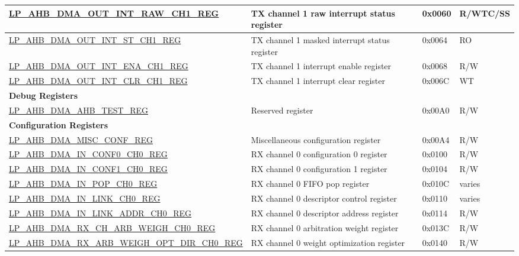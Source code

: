 \begin{longtable}{ | l | p{10cm} | p{1.3cm} | l | }
\hyperref[regdesc:LPAHBDMAOUTINTRAWCHNREG]{LP\_AHB\_DMA\_OUT\_INT\_RAW\_CH1\_REG} & TX channel 1 raw interrupt status register & 0x0060 & R/WTC/SS \\ \hline
\hyperref[regdesc:LPAHBDMAOUTINTSTCHNREG]{LP\_AHB\_DMA\_OUT\_INT\_ST\_CH1\_REG} & TX channel 1 masked interrupt status register & 0x0064 & RO \\ \hline
\hyperref[regdesc:LPAHBDMAOUTINTENACHNREG]{LP\_AHB\_DMA\_OUT\_INT\_ENA\_CH1\_REG} & TX channel 1 interrupt enable register & 0x0068 & R/W \\ \hline
\hyperref[regdesc:LPAHBDMAOUTINTCLRCHNREG]{LP\_AHB\_DMA\_OUT\_INT\_CLR\_CH1\_REG} & TX channel 1 interrupt clear register & 0x006C & WT \\ \hline
\multicolumn{4}{|l|}{\textbf{Debug Registers}} \\ \hline
\hyperref[regdesc:LPAHBDMAAHBTESTREG]{LP\_AHB\_DMA\_AHB\_TEST\_REG} & Reserved register & 0x00A0 & R/W \\ \hline
\multicolumn{4}{|l|}{\textbf{Configuration Registers}} \\ \hline
\hyperref[regdesc:LPAHBDMAMISCCONFREG]{LP\_AHB\_DMA\_MISC\_CONF\_REG} & Miscellaneous configuration register & 0x00A4 & R/W \\ \hline
\hyperref[regdesc:LPAHBDMAINCONF0CHNREG]{LP\_AHB\_DMA\_IN\_CONF0\_CH0\_REG} & RX channel 0 configuration 0 register & 0x0100 & R/W \\ \hline
\hyperref[regdesc:LPAHBDMAINCONF1CHNREG]{LP\_AHB\_DMA\_IN\_CONF1\_CH0\_REG} & RX channel 0 configuration 1 register & 0x0104 & R/W \\ \hline
\hyperref[regdesc:LPAHBDMAINPOPCHNREG]{LP\_AHB\_DMA\_IN\_POP\_CH0\_REG} & RX channel 0 FIFO pop register & 0x010C & varies \\ \hline
\hyperref[regdesc:LPAHBDMAINLINKCHNREG]{LP\_AHB\_DMA\_IN\_LINK\_CH0\_REG} & RX channel 0 descriptor control register & 0x0110 & varies \\ \hline
\hyperref[regdesc:LPAHBDMAINLINKADDRCHNREG]{LP\_AHB\_DMA\_IN\_LINK\_ADDR\_CH0\_REG} & RX channel 0 descriptor address register & 0x0114 & R/W \\ \hline
\hyperref[regdesc:LPAHBDMARXCHARBWEIGHCHNREG]{LP\_AHB\_DMA\_RX\_CH\_ARB\_WEIGH\_CH0\_REG} & RX channel 0 arbitration weight register & 0x013C & R/W \\ \hline
\hyperref[regdesc:LPAHBDMARXARBWEIGHOPTDIRCHNREG]{LP\_AHB\_DMA\_RX\_ARB\_WEIGH\_OPT\_DIR\_CH0\_REG} & RX channel 0 weight optimization register & 0x0140 & R/W \\ \hline

\end{longtable}
